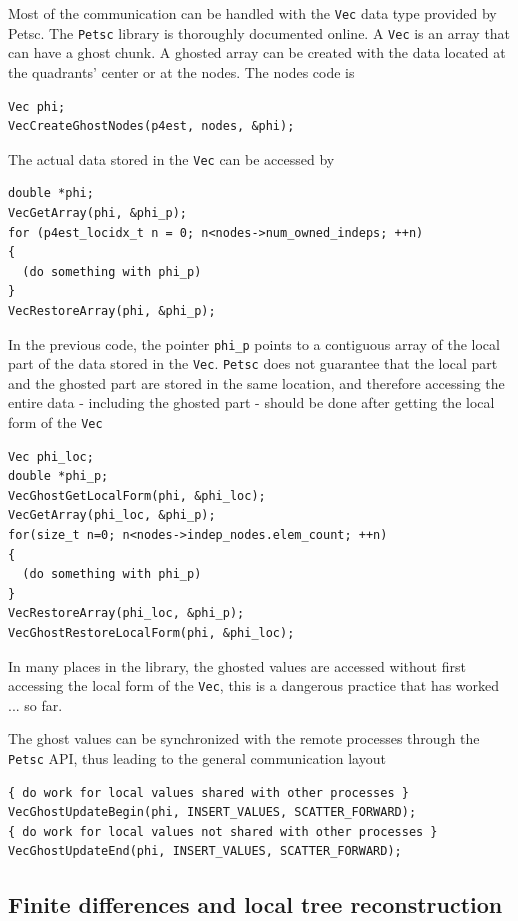 \documentclass{article}
\newcommand{\ttt}[1]{\texttt{#1}}
\begin{document}
Most of the communication can be handled with the \ttt{Vec} data type provided by Petsc. The \ttt{Petsc} library is thoroughly documented online. A \ttt{Vec} is an array that can have a ghost chunk. A ghosted array can be created with the data located at the quadrants' center or at the nodes. The nodes code is
\begin{Verbatim}[frame=single]
Vec phi;
VecCreateGhostNodes(p4est, nodes, &phi);
\end{Verbatim}
The actual data stored in the \ttt{Vec} can be accessed by
\begin{Verbatim}[frame=single]
double *phi;
VecGetArray(phi, &phi_p);
for (p4est_locidx_t n = 0; n<nodes->num_owned_indeps; ++n)
{
  (do something with phi_p)
}
VecRestoreArray(phi, &phi_p);
\end{Verbatim}
In the previous code, the pointer \ttt{phi\_p} points to a contiguous array of the local part of the data stored in the \ttt{Vec}. \ttt{Petsc} does not guarantee that the local part and the ghosted part are stored in the same location, and therefore accessing the entire data - including the ghosted part - should be done after getting the local form of the \ttt{Vec}
\begin{Verbatim}[frame=single]
Vec phi_loc;
double *phi_p;
VecGhostGetLocalForm(phi, &phi_loc);
VecGetArray(phi_loc, &phi_p);
for(size_t n=0; n<nodes->indep_nodes.elem_count; ++n)
{
  (do something with phi_p)
}
VecRestoreArray(phi_loc, &phi_p);
VecGhostRestoreLocalForm(phi, &phi_loc);
\end{Verbatim}
In many places in the library, the ghosted values are accessed without first accessing the local form of the \ttt{Vec}, this is a dangerous practice that has worked ... so far.

The ghost values can be synchronized with the remote processes through the \ttt{Petsc} API, thus leading to the general communication layout
\begin{Verbatim}[frame=single]
{ do work for local values shared with other processes }
VecGhostUpdateBegin(phi, INSERT_VALUES, SCATTER_FORWARD);
{ do work for local values not shared with other processes }
VecGhostUpdateEnd(phi, INSERT_VALUES, SCATTER_FORWARD);
\end{Verbatim}

\subsection{Finite differences and local tree reconstruction}

\newpage


\end{document}
